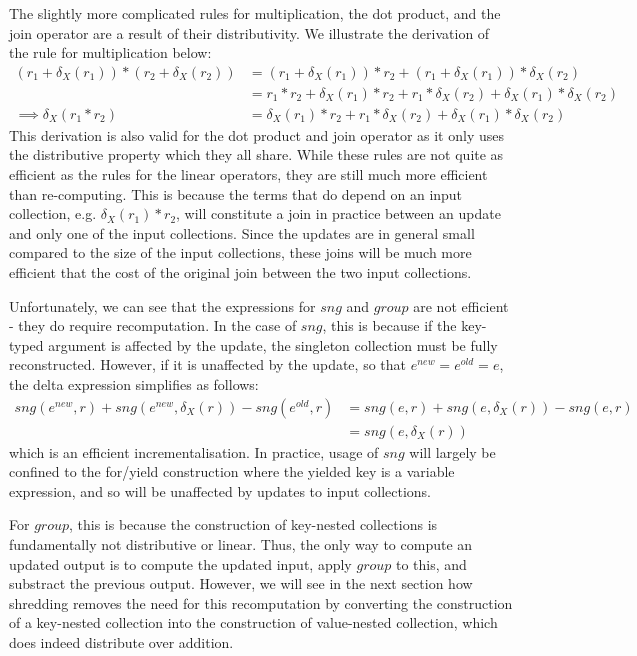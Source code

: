 {{{\vs The slightly more complicated rules for multiplication, the dot product, and the join operator are a result of their distributivity. We illustrate the derivation of the rule for multiplication below:
\begin{equation*}
\begin{split}
(r_1 + \delta_X(r_1))*(r_2 + \delta_X(r_2)) &= (r_1 + \delta_X(r_1))*r_2 + (r_1 + \delta_X(r_1))*\delta_X(r_2) \\
&= r_1*r_2 + \delta_X(r_1)*r_2 + r_1*\delta_X(r_2) + \delta_X(r_1) * \delta_X(r_2) \\
\implies \delta_X(r_1*r_2) &= \delta_X(r_1)*r_2 + r_1*\delta_X(r_2) + \delta_X(r_1) * \delta_X(r_2)
\end{split}
\end{equation*}
This derivation is also valid for the dot product and join operator as it only uses the distributive property which they all share. While these rules are not quite as efficient as the rules for the linear operators, they are still much more efficient than re-computing. This is because the terms that do depend on an input collection, e.g. $\delta_X(r_1) * r_2$, will constitute a join in practice between an update and only one of the input collections. Since the updates are in general small compared to the size of the input collections, these joins will be much more efficient that the cost of the original join between the two input collections.

\vs Unfortunately, we can see that the expressions for $sng$ and $group$ are not efficient - they do require recomputation. In the case of $sng$, this is because if the key-typed argument is affected by the update, the singleton collection must be fully reconstructed. However, if it is unaffected by the update, so that $e^{new} = e^{old} = e$, the delta expression simplifies as follows:
\begin{equation*}
\begin{split}
sng(e^{new},r) + sng(e^{new},\delta_X(r)) - sng(e^{old},r) &= sng(e,r) + sng(e,\delta_X(r)) - sng(e,r) \\
&= sng(e,\delta_X(r))
\end{split}
\end{equation*}
which is an efficient incrementalisation. In practice, usage of $sng$ will largely be confined to the for/yield construction where the yielded key is a variable expression, and so will be unaffected by updates to input collections. 

For $group$, this is because the construction of key-nested collections is fundamentally not distributive or linear. Thus, the only way to compute an updated output is to compute the updated input, apply $group$ to this, and substract the previous output. However, we will see in the next section how shredding removes the need for this recomputation by converting the construction of a key-nested collection into the construction of value-nested collection, which does indeed distribute over addition.
	
}}}
